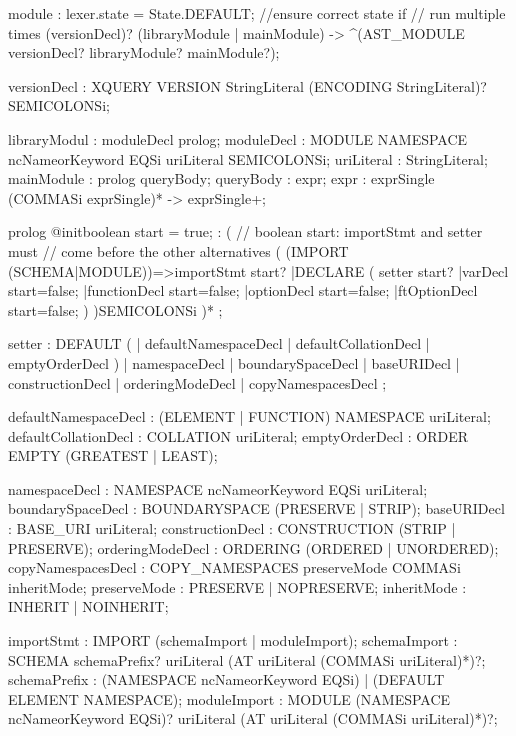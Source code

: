 module : {lexer.state = State.DEFAULT;} //ensure correct state if 
                                        // run multiple times
                    (versionDecl)? 
                    (libraryModule | mainModule)
                  -> ^(AST_MODULE versionDecl? libraryModule? mainModule?);

versionDecl : XQUERY VERSION StringLiteral 
              (ENCODING StringLiteral)? SEMICOLONSi;


libraryModul : moduleDecl prolog;
  moduleDecl : MODULE NAMESPACE ncNameorKeyword EQSi uriLiteral SEMICOLONSi;
    uriLiteral : StringLiteral;
mainModule : prolog queryBody;
  queryBody : expr;
    expr : exprSingle (COMMASi exprSingle)* 
          -> exprSingle+;


prolog @init{boolean start = true;} :
      (
      // boolean start: importStmt and setter must 
      // come before the other alternatives
        (
          (IMPORT (SCHEMA|MODULE))=>importStmt {start}?
          |DECLARE (
          setter {start}?
            |varDecl {start=false;}
            |functionDecl {start=false;}
            |optionDecl {start=false;}
            |ftOptionDecl {start=false;}
            )
        )SEMICOLONSi
      )*
    ;

setter : DEFAULT (
            | defaultNamespaceDecl
            | defaultCollationDecl
            | emptyOrderDecl
          )
          | namespaceDecl
          | boundarySpaceDecl
          | baseURIDecl 
          | constructionDecl 
          | orderingModeDecl 
          | copyNamespacesDecl
       ;

defaultNamespaceDecl : (ELEMENT | FUNCTION) NAMESPACE uriLiteral;
defaultCollationDecl : COLLATION uriLiteral;
emptyOrderDecl : ORDER EMPTY (GREATEST | LEAST);

namespaceDecl : NAMESPACE ncNameorKeyword EQSi uriLiteral;
boundarySpaceDecl : BOUNDARYSPACE (PRESERVE | STRIP);
baseURIDecl : BASE_URI uriLiteral;
constructionDecl : CONSTRUCTION (STRIP | PRESERVE);
orderingModeDecl : ORDERING (ORDERED | UNORDERED);
copyNamespacesDecl : COPY_NAMESPACES preserveMode COMMASi inheritMode;
preserveMode : PRESERVE | NOPRESERVE;
inheritMode : INHERIT | NOINHERIT;  

importStmt : IMPORT (schemaImport | moduleImport);
  schemaImport : SCHEMA schemaPrefix? uriLiteral 
                 (AT uriLiteral (COMMASi uriLiteral)*)?;
    schemaPrefix : (NAMESPACE ncNameorKeyword EQSi) 
                   | (DEFAULT ELEMENT NAMESPACE);
  moduleImport : MODULE (NAMESPACE ncNameorKeyword EQSi)? 
                 uriLiteral (AT uriLiteral (COMMASi uriLiteral)*)?;


